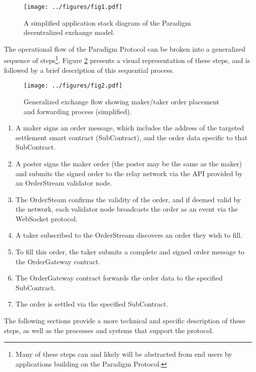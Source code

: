 \documentclass[9pt]{article}
\begin{document}
\begin{figure}[H]
    \centering
    \texttt{[image: ../figures/fig1.pdf]}
    \caption{A simplified application stack diagram of the Paradigm decentralized exchange model.}
    \label{fig:fig1}
\end{figure}

\noindent The operational flow of the Paradigm Protocol can be broken into a generalized sequence of steps\footnote{Many of these steps can and likely will be abstracted from end users by applications building on the Paradigm Protocol.}. Figure \ref{fig:fig2} presents a visual representation of these steps, and is followed by a brief description of this sequential process. 

\begin{figure}[H]
    \centering
    \texttt{[image: ../figures/fig2.pdf]}
    \caption{Generalized exchange flow showing maker/taker order placement and forwarding process (simplified). }
    \label{fig:fig2}
\end{figure}

\begin {enumerate}
\item A maker signs an order message, which includes the address of the targeted settlement smart contract (SubContract), and the order data specific to that SubContract.
\item A poster signs the maker order (the poster may be the same as the maker) and submits the signed order to the relay network via the API provided by an OrderStream validator node.
\item The OrderSteam confirms the validity of the order, and if deemed valid by the network, each validator node broadcasts the order as an event via the WebSocket protocol.
\item A taker subscribed to the OrderStream discovers an order they wish to fill.
\item To fill this order, the taker submits a complete and signed order message to the OrderGateway contract.
\item The OrderGateway contract forwards the order data to the specified SubContract.
\item The order is settled via the specified SubContract.
\end{enumerate}

\noindent The following sections provide a more technical and specific description of these steps, as well as the processes and systems that support the protocol.
\end{document}
